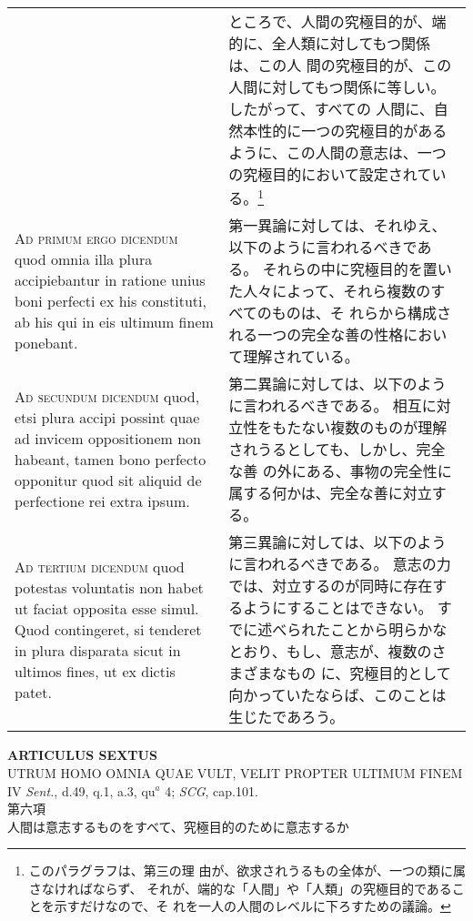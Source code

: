 \documentclass[10pt]{jsarticle} %
\begin{document}
\begin{longtable}{p{21em}p{21em}}
&


 ところで、人間の究極目的が、端的に、全人類に対してもつ関係は、この人
 間の究極目的が、この人間に対してもつ関係に等しい。したがって、すべての
 人間に、自然本性的に一つの究極目的があるように、この人間の意志は、一つ
 の究極目的において設定されている。\footnote{このパラグラフは、第三の理
 由が、欲求されうるもの全体が、一つの類に属さなければならず、
それが、端的な「人間」や「人類」の究極目的であることを示すだけなので、そ
 れを一人の人間のレベルに下ろすための議論。}

 
\\


{\scshape Ad primum ergo dicendum} quod omnia illa
plura accipiebantur in ratione unius boni perfecti ex his constituti, ab
his qui in eis ultimum finem ponebant.


&


第一異論に対しては、それゆえ、以下のように言われるべきである。
それらの中に究極目的を置いた人々によって、それら複数のすべてのものは、そ
 れらから構成される一つの完全な善の性格において理解されている。

\\


{\scshape Ad secundum dicendum} quod, etsi plura
accipi possint quae ad invicem oppositionem non habeant, tamen bono
perfecto opponitur quod sit aliquid de perfectione rei extra ipsum.


&

第二異論に対しては、以下のように言われるべきである。
相互に対立性をもたない複数のものが理解されうるとしても、しかし、完全な善
 の外にある、事物の完全性に属する何かは、完全な善に対立する。


\\


{\scshape Ad tertium dicendum} quod potestas
voluntatis non habet ut faciat opposita esse simul. Quod contingeret, si
tenderet in plura disparata sicut in ultimos fines, ut ex dictis patet.


&


第三異論に対しては、以下のように言われるべきである。
意志の力では、対立するのが同時に存在するようにすることはできない。
すでに述べられたことから明らかなとおり、もし、意志が、複数のさまざまなもの
 に、究極目的として向かっていたならば、このことは生じたであろう。



\end{longtable}
\newpage




\begin{center}
 {\Large {\bf ARTICULUS SEXTUS}}\\
 {\large UTRUM HOMO OMNIA QUAE VULT, VELIT PROPTER ULTIMUM FINEM}\\
 {\footnotesize IV {\itshape Sent.}, d.49, q.1, a.3, qu$^a$ 4; {\itshape
 SCG}, cap.101.}\\
 {\Large 第六項\\人間は意志するものをすべて、究極目的のために意志するか}
\end{center}
\end{document}
